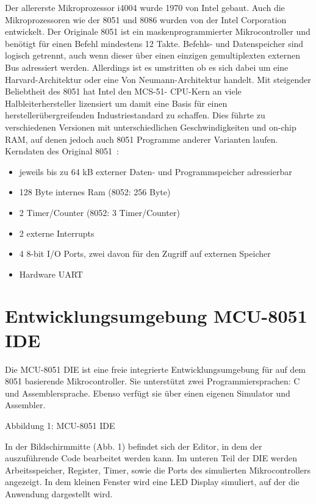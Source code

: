 Der allererste Mikroprozessor i4004 wurde 1970 von Intel gebaut. Auch die Mikroprozessoren wie der 8051 und 8086 wurden von der Intel Corporation entwickelt. Der Originale 8051 ist ein maskenprogrammierter Mikrocontroller und benötigt für einen Befehl mindestens 12 Takte. Befehls- und Datenspeicher sind logisch getrennt, auch wenn dieser über einen einzigen gemultiplexten externen Bus adressiert werden. Allerdings ist es umstritten ob es sich dabei um eine Harvard-Architektur oder eine Von Neumann-Architektur handelt. Mit steigender Beliebtheit des 8051 hat Intel den MCS-51- CPU-Kern an viele Halbleiterhersteller lizensiert um damit eine Basis für einen herstellerübergreifenden Industriestandard zu schaffen. Dies führte zu verschiedenen Versionen mit unterschiedlichen Geschwindigkeiten und on-chip RAM, auf denen jedoch auch 8051 Programme anderer Varianten laufen. ~\cite{wiki_MCS}~\cite{weller_Mikros}\\

Kerndaten des Original 8051~\cite{microcontroller_8051}: 

\begin{itemize}
	\item jeweils bis zu 64 kB externer Daten- und Programmspeicher adressierbar
	\item 128 Byte internes Ram (8052: 256 Byte)
	\item 2 Timer/Counter (8052: 3 Timer/Counter)
	\item 2 externe Interrupts
	\item 4 8-bit I/O Ports, zwei davon für den Zugriff auf externen Speicher
	\item Hardware UART
\end{itemize}

\newpage 

\section{Entwicklungsumgebung MCU-8051 IDE}

Die MCU-8051 DIE ist eine freie integrierte Entwicklungsumgebung für auf dem 8051 basierende Mikrocontroller. Sie unterstützt zwei Programmiersprachen: C und Assemblersprache. Ebenso verfügt sie über einen eigenen Simulator und Assembler.~\cite{wiki_MCU_8051_IDE}


Abbildung 1: MCU-8051 IDE



In der Bildschirmmitte (Abb. 1) befindet sich der Editor, in dem der auszuführende Code bearbeitet werden kann. Im unteren Teil der DIE werden Arbeitsspeicher, Register, Timer, sowie die Ports des simulierten Mikrocontrollers angezeigt. In dem kleinen Fenster wird eine LED Display simuliert, auf der die Anwendung dargestellt wird.

